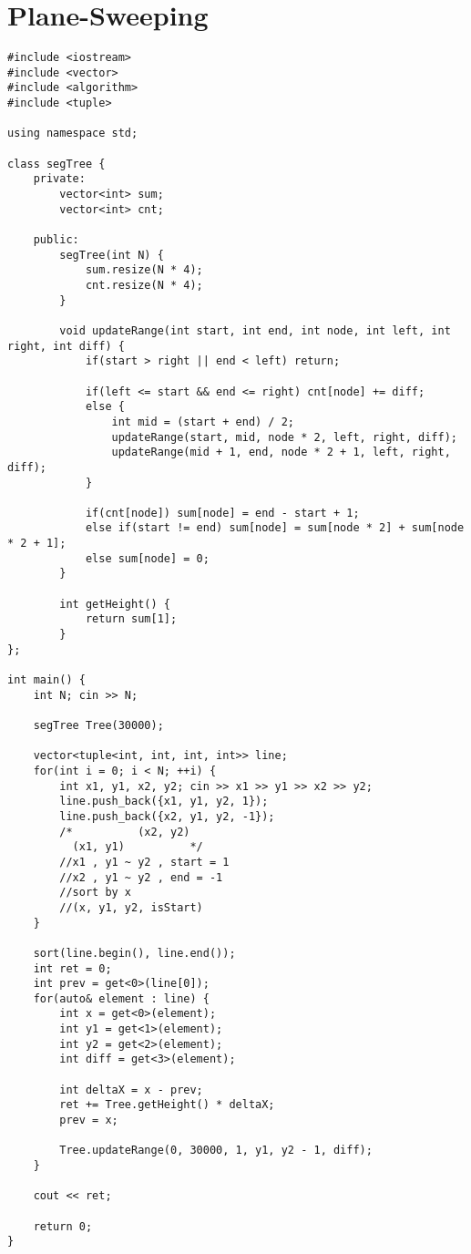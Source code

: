 \documentclass[landscape, 8pt, a4paper, oneside, twocolumn]{extarticle}
\begin{document}
\section{Plane-Sweeping}
\begin{verbatim}
#include <iostream>
#include <vector>
#include <algorithm>
#include <tuple>

using namespace std;

class segTree {
    private:
        vector<int> sum;
        vector<int> cnt;

    public:
        segTree(int N) {
            sum.resize(N * 4);
            cnt.resize(N * 4);
        }

        void updateRange(int start, int end, int node, int left, int right, int diff) {
            if(start > right || end < left) return;

            if(left <= start && end <= right) cnt[node] += diff;
            else {
                int mid = (start + end) / 2;
                updateRange(start, mid, node * 2, left, right, diff);
                updateRange(mid + 1, end, node * 2 + 1, left, right, diff);
            }

            if(cnt[node]) sum[node] = end - start + 1;
            else if(start != end) sum[node] = sum[node * 2] + sum[node * 2 + 1];
            else sum[node] = 0;
        }

        int getHeight() {
            return sum[1];
        }
};

int main() {
    int N; cin >> N;

    segTree Tree(30000);

    vector<tuple<int, int, int, int>> line;
    for(int i = 0; i < N; ++i) {
        int x1, y1, x2, y2; cin >> x1 >> y1 >> x2 >> y2;
        line.push_back({x1, y1, y2, 1});
        line.push_back({x2, y1, y2, -1});
        /*          (x2, y2)
          (x1, y1)          */
        //x1 , y1 ~ y2 , start = 1
        //x2 , y1 ~ y2 , end = -1
        //sort by x
        //(x, y1, y2, isStart)
    }

    sort(line.begin(), line.end());
    int ret = 0;
    int prev = get<0>(line[0]);
    for(auto& element : line) {
        int x = get<0>(element);
        int y1 = get<1>(element);
        int y2 = get<2>(element);
        int diff = get<3>(element);

        int deltaX = x - prev;
        ret += Tree.getHeight() * deltaX;
        prev = x;

        Tree.updateRange(0, 30000, 1, y1, y2 - 1, diff);
    }

    cout << ret;

    return 0;
}
\end{verbatim}
\end{document}
